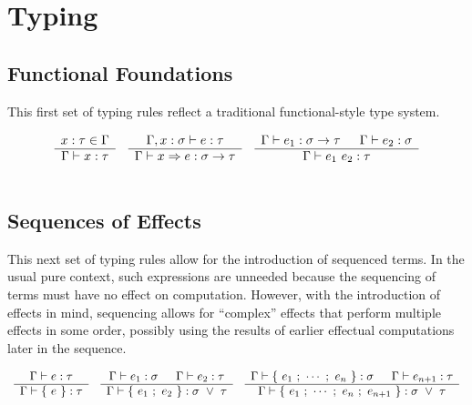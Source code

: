 \documentclass{article}
\begin{document}
\section{Typing}

\subsection{Functional Foundations}
This first set of typing rules reflect a traditional functional-style type system.

\[ \begin{array}{ccc}
  \begin{array}{c}  x:\tau \in \Gamma  \\ \hline  \Gamma \vdash x:\tau  \end{array}

   &

  \begin{array}{c}  \Gamma, x:\sigma \vdash e:\tau  \\ \hline \Gamma \vdash x \Rightarrow e : \sigma \rightarrow \tau  \end{array}

   &

  \begin{array}{c}  \Gamma \vdash e_1 : \sigma \rightarrow \tau \hspace{1.5em}
   \Gamma \vdash e_2 : \sigma  \\ \hline  \Gamma \vdash e_1 ~ e_2 : \tau  \end{array}

  \\\\
 \end{array} \]

\noindent
\subsection{Sequences of Effects}
This next set of typing rules allow for the introduction of sequenced terms.
In the usual pure context, such expressions are unneeded because the sequencing of terms
must have no effect on computation.
However, with the introduction of effects in mind, sequencing allows for ``complex'' effects
that perform multiple effects in some order, possibly using the results of earlier
effectual computations later in the sequence.

\[ \begin{array}{ccc}

  \begin{array}{c} 
   \Gamma \vdash e:\tau
   \\ \hline 
   \Gamma \vdash \{ ~ e ~ \} : \tau
   \end{array}

   &

  \begin{array}{c} 
   \Gamma \vdash e_1:\sigma \hspace{1.5em}
   \Gamma \vdash e_2:\tau
   \\ \hline 
   \Gamma \vdash \{ ~ e_1 ~ ; ~ e_2 ~ \} : \sigma ~ \lor ~ \tau
   \end{array}

   &

  \begin{array}{c} 
   \Gamma \vdash \{ ~ e_1 ~ ; ~ \cdots ~ ; ~ e_n ~ \} : \sigma \hspace{1.5em}
   \Gamma \vdash e_{n+1} : \tau
   \\ \hline 
   \Gamma \vdash \{ ~ e_1 ~ ; ~ \cdots ~ ; ~ e_n ~ ; ~ e_{n+1} ~ \}
   : \sigma ~ \lor ~ \tau
   \end{array}

  \\\\
 \end{array} \]
\end{document}
